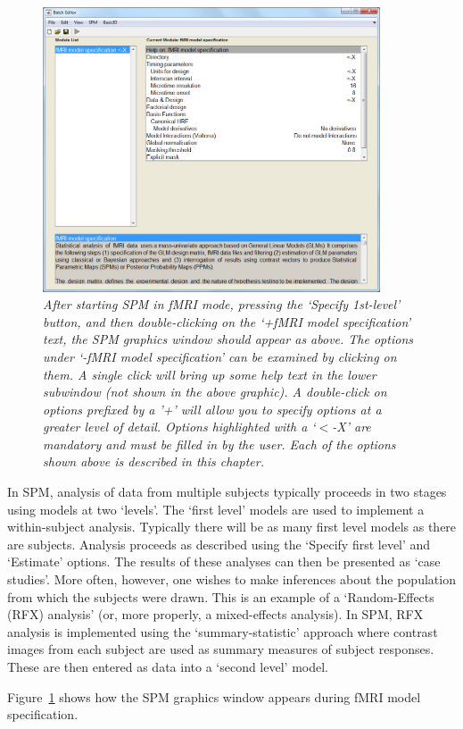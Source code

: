 \begin{figure}
\includegraphics[width=100mm]{fmri_spec/fmri_model}
\caption{\em After starting SPM in fMRI mode, pressing the `Specify 1st-level' button, and then double-clicking on the `+fMRI model specification' text, the SPM graphics window should appear as above. The options under `-fMRI model specification' can be examined by clicking on them. A single click will bring up some help text in the lower subwindow (not shown in the above graphic). 
A double-click on options prefixed by a '+' will allow you to specify 
options at a greater level of detail. Options highlighted with a `$<$-X' are mandatory and must be filled in by the user. Each of the options shown above is described in this chapter. \label{spec}}
\end{figure}


In SPM, analysis of data from multiple subjects typically proceeds in two stages using models at two `levels'. The `first level' models are used to implement a within-subject analysis. Typically there will be as many first level models as there are subjects. Analysis proceeds as described using the `Specify first level' and `Estimate' options. The results of these analyses can then be presented as `case studies'. More often, however, one wishes to make inferences about the population from which the subjects were drawn. This is an example of a `Random-Effects (RFX) analysis' (or, more properly, a mixed-effects analysis). In SPM, RFX analysis is implemented using the `summary-statistic' approach where contrast images from each subject are used as summary measures of subject responses. These are then entered as data into a `second level' model. 

Figure~\ref{spec} shows how the SPM graphics window appears during 
fMRI model specification. 

